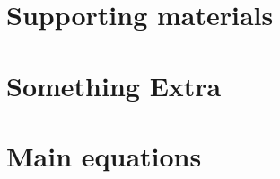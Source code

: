 \chapter{Supporting materials}
    \label{sec:supportingMaterial}
    

\cleardoublepage

\chapter{Something Extra}
    

\ifnomenclature
\cleardoublepage

\chapter{Main equations}
    \label{ch:NomenclatureExamples}
    
